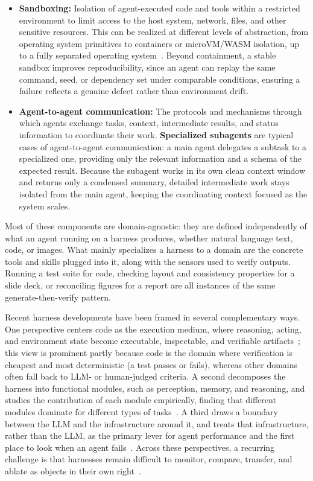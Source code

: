 \documentclass{article}
\begin{document}
\begin{itemize}
     \item \textbf{Sandboxing:} Isolation of agent-executed code and tools within a restricted environment to limit access to the host system, network, files, and other sensitive resources. This can be realized at different levels of abstraction, from operating system primitives to containers or microVM/WASM isolation, up to a fully separated operating system~\cite{sandbox-envs}. Beyond containment, a stable sandbox improves reproducibility, since an agent can replay the same command, seed, or dependency set under comparable conditions, ensuring a failure reflects a genuine defect rather than environment drift.
    
    \item \textbf{Agent-to-agent communication:} The protocols and mechanisms through which agents exchange tasks, context, intermediate results, and status information to coordinate their work. \textbf{Specialized subagents} are typical cases of agent-to-agent communication: a main agent delegates a subtask to a specialized one, providing only the relevant information and a schema of the expected result. Because the subagent works in its own clean context window and returns only a condensed summary, detailed intermediate work stays isolated from the main agent, keeping the coordinating context focused as the system scales.
\end{itemize}

\noindent Most of these components are domain-agnostic: they are defined independently of what an agent running on a harness produces, whether natural language text, code, or images. What mainly specializes a harness to a domain are the concrete tools and skills plugged into it, along with the sensors used to verify outputs. Running a test suite for code, checking layout and consistency properties for a slide deck, or reconciling figures for a report are all instances of the same generate-then-verify pattern.

\vspace{5px}

\noindent Recent harness developments have been framed in several complementary ways. One perspective centers code as the execution medium, where reasoning, acting, and environment state become executable, inspectable, and verifiable artifacts~\cite{code-harness}; this view is prominent partly because code is the domain where verification is cheapest and most deterministic (a test passes or fails), whereas other domains often fall back to LLM- or human-judged criteria. A second decomposes the harness into functional modules, such as perception, memory, and reasoning, and studies the contribution of each module empirically, finding that different modules dominate for different types of tasks~\cite{modular-harness}. A third draws a boundary between the LLM and the infrastructure around it, and treats that infrastructure, rather than the LLM, as the primary lever for agent performance and the first place to look when an agent fails~\cite{anatomy-harness}. Across these perspectives, a recurring challenge is that harnesses remain difficult to monitor, compare, transfer, and ablate as objects in their own right~\cite{nl-harness}.
\end{document}
